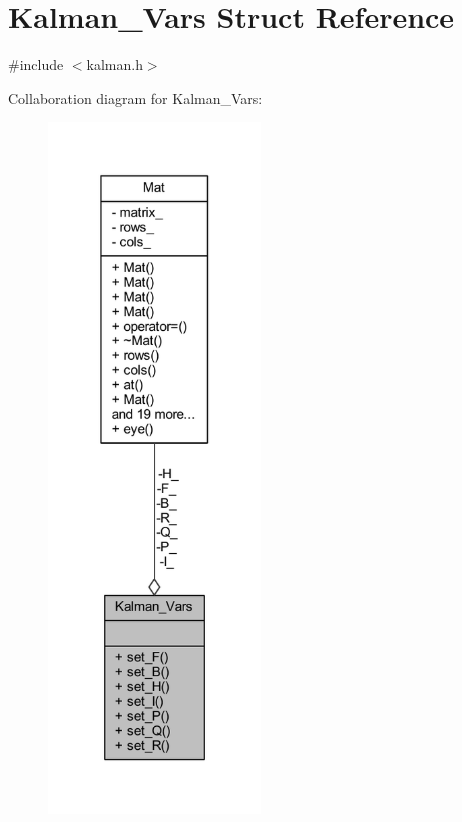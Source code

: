 \hypertarget{struct_kalman___vars}{}\section{Kalman\+\_\+\+Vars Struct Reference}
\label{struct_kalman___vars}


{\ttfamily \#include $<$kalman.\+h$>$}



Collaboration diagram for Kalman\+\_\+\+Vars\+:
\nopagebreak
\begin{figure}[H]
\begin{center}
\leavevmode
\includegraphics[width=160pt]{struct_kalman___vars__coll__graph}
\end{center}
\end{figure}
